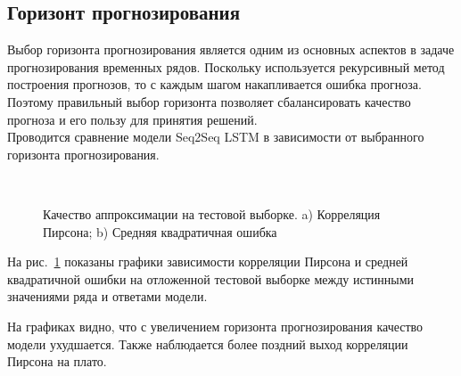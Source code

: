 \subsection{Горизонт прогнозирования}

Выбор горизонта прогнозирования является одним из основных аспектов в задаче прогнозирования временных рядов. Поскольку используется рекурсивный метод построения прогнозов, то с каждым шагом накапливается ошибка прогноза. Поэтому правильный выбор горизонта позволяет сбалансировать качество прогноза и его пользу для принятия решений. \\

Проводится сравнение модели Seq2Seq LSTM в зависимости от выбранного горизонта прогнозирования.

\begin{figure}[H]\center
{}
\\
\caption{Качество аппроксимации на тестовой выборке. a) Корреляция Пирсона; b) Средняя квадратичная ошибка}
\label{horizon_plots}
\end{figure}

На рис.~\ref{horizon_plots} показаны графики зависимости корреляции Пирсона и средней квадратичной ошибки на отложенной тестовой выборке между истинными значениями ряда и ответами модели.

На графиках видно, что с увеличением горизонта прогнозирования качество модели ухудшается. Также наблюдается более поздний выход корреляции Пирсона на плато.

